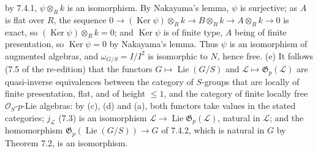 by 7.4.1, \(\psi\otimes_Rk\) is an isomorphism. By Nakayama's lemma,
\(\psi\) is surjective; as \(A\) is flat over \(R\), the sequence
\(0\to(\operatorname{Ker}\psi)\otimes_Rk\to B\otimes_Rk\to A\otimes_Rk\to0\)
is exact, so \((\operatorname{Ker}\psi)\otimes_Rk=0\); and
\(\operatorname{Ker}\psi\) is of finite type, \(A\) being of finite
presentation, so \(\operatorname{Ker}\psi=0\) by Nakayama's lemma. Thus
\(\psi\) is an isomorphism of augmented algebras, and
\(\omega_{G/S}=I/I^2\) is isomorphic to \(N\), hence free.
(e) It follows (7.5 of the re-edition) that the functors
\(G\mapsto\operatorname{Lie}(G/S)\) and
\(\mathcal L\mapsto\mathfrak G_p(\mathcal L)\) are quasi-inverse
equivalences between the category of \(S\)-groups that are locally of
finite presentation, flat, and of height \(\leq1\), and the category of
finite locally free \(\mathcal O_S\)-\(p\)-Lie algebras: by (c), (d) and
(a), both functors take values in the stated categories;
\(j_{\mathcal L}\) (7.3) is an isomorphism
\(\mathcal L\to\operatorname{Lie}\mathfrak G_p(\mathcal L)\), natural in
\(\mathcal L\); and the homomorphism
\(\mathfrak G_p(\operatorname{Lie}(G/S))\to G\) of 7.4.2, which is natural
in \(G\) by Theorem 7.2, is an isomorphism.


